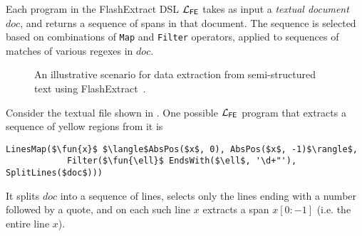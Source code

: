 Each program in the FlashExtract DSL $\mathcal{L}_{\mathsf{FE}}$ takes as input a \emph{textual document} $doc$, and returns a sequence
of spans in that document.
The sequence is selected based on combinations of \texttt{Map} and \texttt{Filter} operators, applied to sequences of
matches of various regexes in $doc$.

\begin{figure}[t]
    \centering
    \begin{tcbraster}[beamer, raster columns=1, size=minimal]
    \end{tcbraster}
    \caption{An illustrative scenario for data extraction from semi-structured text using FlashExtract~\cite[Figure
    1]{flashextract}.}
    \label{fig:example:flashextract}
    \vspace{-\baselineskip}
\end{figure}

\begin{example}
    \label{ex:background:fe}
    Consider the textual file shown in .
    One possible $\mathcal{L}_{\mathsf{FE}}$ program that extracts a sequence of yellow regions from it is
    \begin{lstlisting}[language=dsl]
        LinesMap($\fun{x}$ $\langle$AbsPos($x$, 0), AbsPos($x$, -1)$\rangle$,
            Filter($\fun{\ell}$ EndsWith($\ell$, '\d+"'), SplitLines($doc$)))
    \end{lstlisting}
    It splits $doc$ into a sequence of lines, selects only the lines ending with a number followed by a quote, and on
    each such line $x$ extracts a span $x[0:-1]$ (i.e. the entire line $x$).
\end{example}

